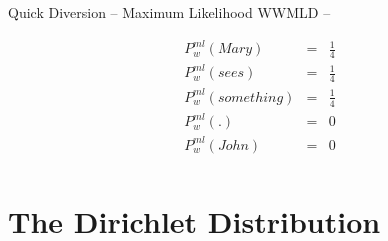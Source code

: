 \documentclass[11pt]{beamer}
\begin{document}
	\begin{frame}{Quick Diversion -- Maximum Likelihood}
		WWMLD --
		
		\begin{align*}
			P^{ml}_{w}(Mary) & = & \frac{1}{4}\\
			P^{ml}_{w}(sees) & = & \frac{1}{4}\\
			P^{ml}_{w}(something) & = & \frac{1}{4}\\
			P^{ml}_{w}(.) & = & 0 \\
			P^{ml}_{w}(John) & = & 0\\
		\end{align*}		
	\end{frame}
	
	\section{The Dirichlet Distribution}
	
\end{document}
